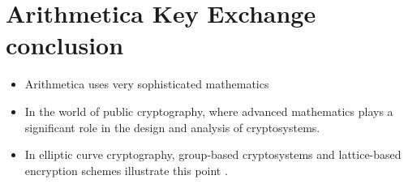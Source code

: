\documentclass[12pt]{article}
\begin{document}
         \chapter{Arithmetica Key Exchange conclusion}
			\begin{itemize}
			    \item Arithmetica uses very sophisticated mathematics
			    \item In the world of public cryptography, where advanced mathematics plays a significant role in the design and analysis of cryptosystems. 
			    \item In elliptic curve cryptography, group-based cryptosystems and lattice-based encryption schemes illustrate this point \cite{stamp2007applied}.
			\end{itemize}
  
    	
    	
\end{document}
